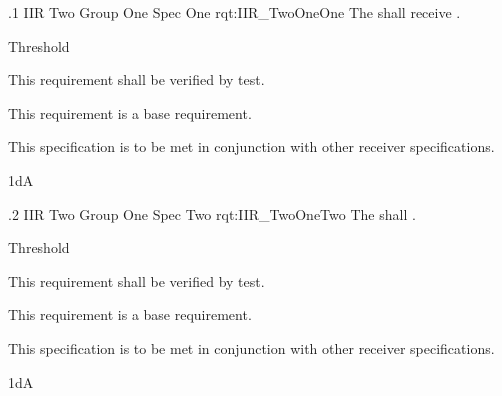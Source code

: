 \ONERQMTV
{\RqtNumberBase.1}
{IIR Two Group One Spec One}
{rqt:IIR_TwoOneOne}
{The \ThisSys{} shall receive \TBD.}
{
	\item [Phase 1] Threshold
}
{This requirement shall be verified by test.}
{
	\item [N/A] This requirement is a base requirement.
}
{
	\item This specification is to be met in conjunction with other receiver specifications.
}
{1dA}

\ONERQMTV
{\RqtNumberBase.2}
{IIR Two Group One Spec Two}
{rqt:IIR_TwoOneTwo}
{The \ThisSys{} shall \TBD.}
{
	\item [Phase 1] Threshold
}
{This requirement shall be verified by test.}
{
	\item [N/A] This requirement is a base requirement.
}
{
	\item This specification is to be met in conjunction with other receiver specifications.
}
{1dA}
